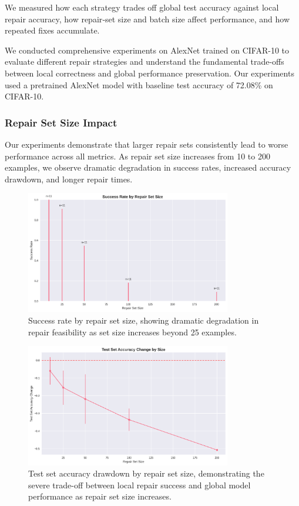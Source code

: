 \documentclass{article}
\begin{document}
We measured how each strategy trades off global test accuracy against local repair accuracy, how repair‐set size and batch size affect performance, and how repeated fixes accumulate.

We conducted comprehensive experiments on AlexNet trained on CIFAR-10 to evaluate different repair strategies and understand the fundamental trade-offs between local correctness and global performance preservation. Our experiments used a pretrained AlexNet model with baseline test accuracy of 72.08\% on CIFAR-10.

\subsubsection{Repair Set Size Impact}

Our experiments demonstrate that larger repair sets consistently lead to worse performance across all metrics. As repair set size increases from 10 to 200 examples, we observe dramatic degradation in success rates, increased accuracy drawdown, and longer repair times.

\begin{figure}[h]
	\centering
	\includegraphics[width=0.8\textwidth]{results/one_shot_analysis/success_rates/success_rate_by_size.png}
	\caption{Success rate by repair set size, showing dramatic degradation in repair feasibility as set size increases beyond 25 examples.}
	\label{fig:success_rate_by_size}
\end{figure}

\begin{figure}[h]
	\centering
	\includegraphics[width=0.8\textwidth]{results/one_shot_analysis/accuracy/accuracy_change_by_size.png}
	\caption{Test set accuracy drawdown by repair set size, demonstrating the severe trade-off between local repair success and global model performance as repair set size increases.}
	\label{fig:accuracy_drawdown_by_size}
\end{figure}
\end{document}
